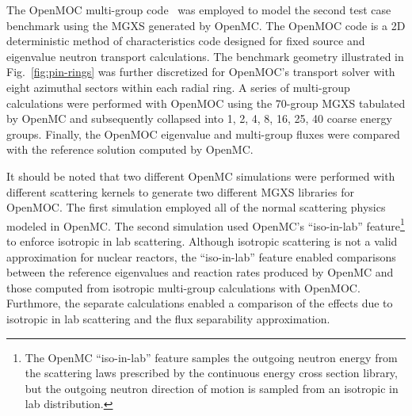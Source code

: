 The OpenMOC multi-group code~\citep{boyd2014openmoc} was employed to model the second test case benchmark using the MGXS generated by OpenMC. The OpenMOC code is a 2D deterministic method of characteristics code designed for fixed source and eigenvalue neutron transport calculations. The benchmark geometry illustrated in Fig.~\ref{fig:pin-rings} was further discretized for OpenMOC's transport solver with eight azimuthal sectors within each radial ring. A series of multi-group calculations were performed with OpenMOC using the 70-group MGXS tabulated by OpenMC and subsequently collapsed into 1, 2, 4, 8, 16, 25, 40 coarse energy groups. Finally, the OpenMOC eigenvalue and multi-group fluxes were compared with the reference solution computed by OpenMC.

It should be noted that two different OpenMC simulations were performed with different scattering kernels to generate two different MGXS libraries for OpenMOC. The first simulation employed all of the normal scattering physics modeled in OpenMC. The second simulation used OpenMC's ``iso-in-lab'' feature\footnote{The OpenMC ``iso-in-lab'' feature samples the outgoing neutron energy from the scattering laws prescribed by the continuous energy cross section library, but the outgoing neutron direction of motion is sampled from an isotropic in lab distribution.} to enforce isotropic in lab scattering. Although isotropic scattering is not a valid approximation for nuclear reactors, the ``iso-in-lab'' feature enabled comparisons between the reference eigenvalues and reaction rates produced by OpenMC and those computed from isotropic multi-group calculations with OpenMOC. Furthmore, the separate calculations enabled a comparison of the effects due to isotropic in lab scattering and the flux separability approximation.